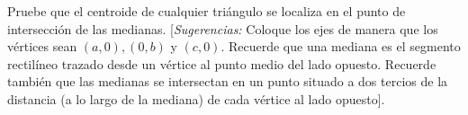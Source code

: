 \item Pruebe que el centroide de cualquier triángulo se localiza en el punto de intersección de las medianas. [\textit{Sugerencias:} Coloque los ejes de manera que los vértices sean $(a, 0), (0, b)$ y $(c, 0)$. Recuerde que una mediana es el segmento rectilíneo trazado desde un vértice al punto medio del lado opuesto. Recuerde también que las medianas se intersectan en un punto situado a dos tercios de la distancia (a lo largo de la mediana) de cada vértice al lado opuesto].
